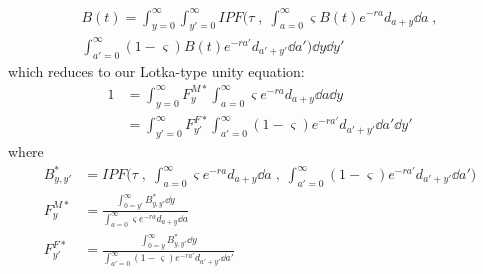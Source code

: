 \begin{equation}
\label{eq:ex2sexIPFunity3}
\begin{split}
B(t) = \int _{y=0}^\infty \int _{y'=0}^\infty IPF\Bigg(\tau\;,\;
 \int_{a=0}^\infty \varsigma B(t) e^{-ra}d_{a+y} \dd a\;, \\ 
 \int_{a'=0}^\infty (1-\varsigma) B(t)e^{-ra'}d_{a'+y'} \dd a'\Bigg) \dd y \dd
 y'
\end{split}
\end{equation}
which reduces to our Lotka-type unity equation:
\begin{align}
\label{eq:ex2sexIPFunity3}
1 &= \int _{y=0}^\infty F_{y}^{M\ast} \int_{a=0}^\infty \varsigma e^{-ra}d_{a+y}
\dd a \dd y \\ 
&= \int _{y'=0}^\infty F_{y'}^{F\ast} \int_{a'=0}^\infty
(1-\varsigma) e^{-ra'}d_{a'+y'} \dd a' \dd y'
\end{align}
where
\begin{align}
\label{eq:exipfbyyp}
B_{y,y'}^\ast &= IPF\Bigg(\tau\;,\;
 \int_{a=0}^\infty \varsigma e^{-ra}d_{a+y} \dd a\;,\;
 \int_{a'=0}^\infty (1-\varsigma) e^{-ra'}d_{a'+y'} \dd a'\Bigg) \\
 \label{eq:exipffy}
F_{y}^{M\ast} &= \frac{\int_{0=y'}^\infty B_{y,y'}^\ast \dd
y}{\int_{a=0}^\infty\varsigma e^{-ra}d_{a+y} \dd a} \\
 \label{eq:exipffyp}
F_{y'}^{F\ast} &= \frac{\int_{0=y}^\infty B_{y,y'}^\ast \dd
y}{\int_{a'=0}^\infty (1-\varsigma) e^{-ra'}d_{a'+y'} \dd a'} 
\end{align}




